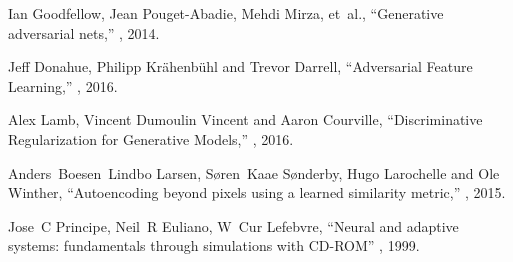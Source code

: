 \documentclass{article} %
\begin{document}
\begin{thebibliography}{10}
Ian Goodfellow, Jean Pouget-Abadie, Mehdi Mirza, et~al.,
\newblock ``Generative adversarial nets,''
, 2014.

Jeff Donahue, Philipp Kr{\"a}henb{\"u}hl and Trevor Darrell,
\newblock ``Adversarial Feature Learning,''
, 2016.

Alex Lamb, Vincent Dumoulin Vincent and Aaron Courville,
\newblock ``Discriminative Regularization for Generative Models,''
, 2016.

Anders~Boesen~Lindbo Larsen, S{\o}ren~Kaae S{\o}nderby, Hugo Larochelle and Ole Winther,
\newblock ``Autoencoding beyond pixels using a learned similarity metric,''
, 2015.

Jose~C Principe, Neil~R Euliano, W~Cur Lefebvre,
\newblock ``Neural and adaptive systems: fundamentals through simulations with CD-ROM''
, 1999.

\end{thebibliography}
\end{document}
